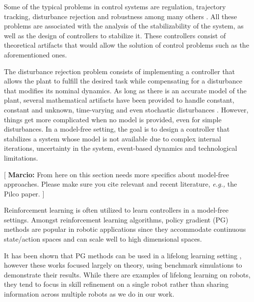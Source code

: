\documentclass{aamas2016}
\newcommand{\note}[3]{{\color{#2} [ \ding{42} \textbf{#1:} {\small #3} ]}}
\newcommand{\comMarcio}[1]{\note{Marcio}{red}{#1}}
\begin{document}
Some of the typical problems in control systems are regulation, trajectory tracking, disturbance rejection and
robustness among many others \cite{Khalil-2002, Lewis-2012,Nise-2010}. All these problems are associated with the analysis of the stabilizability of the system, 
as well as the design of controllers to stabilize it. These controllers consist of theoretical artifacts that would allow 
the solution of control problems such as the aforementioned ones.

The disturbance rejection problem consists of implementing a controller that allows the plant to fulfill the desired task while compensating
for a disturbance that modifies its nominal dynamics. As long as there is an accurate model of the plant, several mathematical
artifacts have been provided to handle constant, constant and unknown, time-varying and even stochastic disturbances 
\cite{Dorato-2000,Khalil-2002,Lewis-2012}. 
However, things get more complicated when no model is provided, even for simple disturbances. In a model-free setting, the goal is to design a 
controller that stabilizes a system whose model is not available due to complex internal iterations, uncertainty in the system, event-based
dynamics and technological limitations.

\comMarcio{From here on this section needs more specifics about model-free approaches. Please make sure you cite 
relevant and recent literature, \emph{e.g.,} the Pilco paper.}

Reinforcement learning \cite{kober2013reinforcement} is often utilized to learn controllers in a model-free settings. Amongst reinforcement learning algorithms, policy gradient (PG) methods \cite{sutton1999policy} are popular in robotic applications since they accommodate continuous state/action spaces and can scale well to high dimensional spaces. 


It has been shown that PG methods can be used in a lifelong learning setting \cite{BouAmmar2014a,bouAmmar2015unsupervised}, however these works focused largely on theory, using benchmark simulations to demonstrate their results. While there are examples of lifelong learning on robots, they tend to focus in skill refinement on a single robot \cite{kleiner2002towards,thrun1995lifelong} rather than sharing information across multiple robots as we do in our work. 
\end{document}

